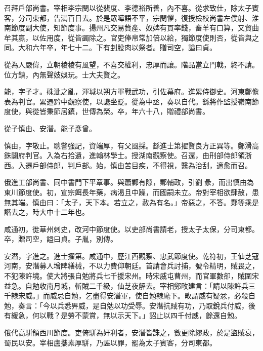 \begin{pinyinscope}
 召拜戶部尚書。宰相李宗閔以從裴度、李德裕所善，內不喜。從求致仕，除太子賓客，分司東都，告滿百日去。於是眾嘩語不平，宗閔懼，復授檢校尚書左僕射、淮南節度副大使，知節度事。揚州凡交易貲產、奴婢有貫率錢，畜羊有口算，又貿曲牟其贏，以佐用度，從皆蠲除之。官吏俸帛常加倍以給，獨節度使則否，從皆與之同。大和六年卒，年七十二。下有刲股肉以祭者。贈司空，謚曰貞。



 從為人嚴偉，立朝棱棱有風望，不喜交權利，忠厚而讓。階品當立門戟，終不請。位方鎮，內無聲妓娛玩。士大夫賢之。



 能，字子才。硃泚之亂，渾瑊以朔方軍戰武功，引佐幕府。進累侍御史。河東鄭儋表為判官。累遷黔中觀察使，以讒坐貶。從為中丞，奏以自代。繇將作監授嶺南節度使，與從皆秉節居鎮，世傳為榮。卒，年六十八，贈禮部尚書。



 從子慎由、安潛。能子彥曾。



 慎由，字敬止。聰警強記，資端厚，有父風採。繇進士第擢賢良方正異等。鄭滑高銖闢府判官。入為右拾遺，進翰林學士。授湖南觀察使。召還，由刑部侍郎領浙西。入遷戶部侍郎，判戶部。始，慎由苦目疾，不得視，醫為治刮，適愈而召。



 俄進工部尚書、同中書門下平章事。與蕭鄴有隙，鄴輔政，引劉彖，而出慎由為東川節度使。初，宣宗餌長年藥，病渴且中躁，而國嗣未立。帝對宰相欲肆赦，患無其端。慎由曰：「太子，天下本。若立之，赦為有名。」帝惡之，不答。鄴等乘是譖去之，時大中十二年也。



 咸通初，徙華州刺史，改河中節度使。以吏部尚書請老，授太子太保，分司東都。卒，贈司空，謚曰貞。子胤，別傳。



 安潛，字進之。進士擢第。咸通中，歷江西觀察、忠武節度使。乾符初，王仙芝寇河南，安潛募人增陴繕械，不以力費仰朝廷。首請會兵討捕，號令精明，賊畏之，不犯陳許境。使大將張自勉將兵七千援宋州。時宋威屯曹州，而官軍數卻，賊圍宋益急。自勉收南月城，斬賊二千級，仙芝夜解去。宰相鄭畋建言：「請以陳許兵三千隸宋威。」而威忌自勉，乞盡得安潛軍，使自勉隸麾下。畋謂威有疑忿，必殺自勉，奏言：「今以兵悉畀威，是自勉以功受辱。安潛抗賊有功，乃取銳兵付威，後有緩急，何以戰？是勞不蒙賞，無以示天下。」詔止以四千付威，餘還自勉。



 俄代高駢領西川節度。吏倚駢為奸利者，安潛皆誅之，數更除繆政，於是盜賊衰，蜀民以安。宰相盧攜素厚駢，乃誣以罪，罷為太子賓客，分司東都。




\end{pinyinscope}
